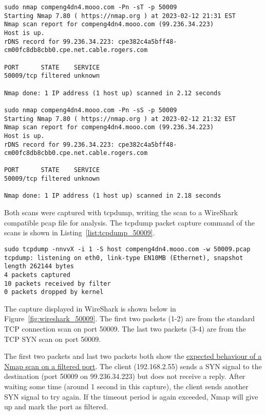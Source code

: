 \begin{lstlisting}[caption=Nmap Scans on Port 50009,label=list:nmap_50009]
sudo nmap compeng4dn4.mooo.com -Pn -sT -p 50009
Starting Nmap 7.80 ( https://nmap.org ) at 2023-02-12 21:31 EST
Nmap scan report for compeng4dn4.mooo.com (99.236.34.223)
Host is up.
rDNS record for 99.236.34.223: cpe382c4a5bff48-cm00fc8db8cbb0.cpe.net.cable.rogers.com

PORT      STATE    SERVICE
50009/tcp filtered unknown

Nmap done: 1 IP address (1 host up) scanned in 2.12 seconds

sudo nmap compeng4dn4.mooo.com -Pn -sS -p 50009
Starting Nmap 7.80 ( https://nmap.org ) at 2023-02-12 21:32 EST
Nmap scan report for compeng4dn4.mooo.com (99.236.34.223)
Host is up.
rDNS record for 99.236.34.223: cpe382c4a5bff48-cm00fc8db8cbb0.cpe.net.cable.rogers.com

PORT      STATE    SERVICE
50009/tcp filtered unknown

Nmap done: 1 IP address (1 host up) scanned in 2.18 seconds
\end{lstlisting}

Both scans were captured with tcpdump, writing the scan to a WireShark compatible pcap file for analysis. The tcpdump packet capture command of the scans is shown in Listing~\ref{list:tcpdump_50009}. 

\begin{lstlisting}[caption=Tcpdump Packet Capture of Scans on Port 50009,label=list:tcpdump_50009]
sudo tcpdump -nnvvX -i 1 -S host compeng4dn4.mooo.com -w 50009.pcap
tcpdump: listening on eth0, link-type EN10MB (Ethernet), snapshot length 262144 bytes
4 packets captured
10 packets received by filter
0 packets dropped by kernel
\end{lstlisting}

The capture displayed in WireShark is shown below in Figure~\ref{fig:wireshark_50009}. The first two packets (1-2) are from the standard TCP connection scan on port 50009. The last two packets (3-4) are from the TCP SYN scan on port 50009.

The first two packets and last two packets both show the \href{https://nmap.org/book/synscan.html#scan-methods-fig-syn-scan-filtered}{expected behaviour of a Nmap scan on a filtered port}. The client (192.168.2.55) sends a SYN signal to the destination (port 50009 on 99.236.34.223) but does not receive a reply. After waiting some time (around 1 second in this capture), the client sends another SYN signal to try again. If the timeout period is again exceeded, Nmap will give up and mark the port as filtered.

